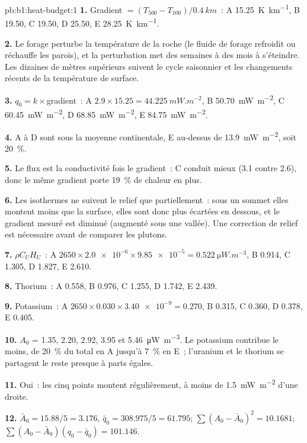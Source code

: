\begin{solution}{pb:b1:heat-budget:1}
\textbf{1.} Gradient $= (T_{500} - T_{100})/\qty{0.4}{km}$~: A \qty{15.25}{K.km^{-1}},
B \num{19.50}, C \num{19.50}, D \num{25.50}, E \qty{28.25}{K.km^{-1}}.

\textbf{2.} Le forage perturbe la température de la roche (le fluide de forage
refroidit ou réchauffe les parois), et la perturbation met des semaines à des mois
à s'éteindre. Les dizaines de mètres supérieurs suivent le cycle saisonnier et les
changements récents de la température de surface.

\textbf{3.} $q_0 = k\times$gradient~: A $2.9\times15.25 = \qty{44.225}{mW.m^{-2}}$,
B \qty{50.70}{mW.m^{-2}}, C \qty{60.45}{mW.m^{-2}}, D \qty{68.85}{mW.m^{-2}},
E \qty{84.75}{mW.m^{-2}}.

\textbf{4.} A à D sont sous la moyenne continentale, E au-dessus de
\qty{13.9}{mW.m^{-2}}, soit \qty{20}{\percent}.

\textbf{5.} Le flux est la conductivité fois le gradient~: C conduit mieux (3.1
contre 2.6), donc le même gradient porte \qty{19}{\percent} de chaleur en plus.

\textbf{6.} Les isothermes ne suivent le relief que partiellement~: sous un sommet
elles montent moins que la surface, elles sont donc plus écartées en dessous, et le
gradient mesuré est diminué (augmenté sous une vallée). Une correction de relief est
nécessaire avant de comparer les plutons.

\textbf{7.} $\rho C_U H_U$~: A $2650\times\num{2.0e-6}\times\num{9.85e-5} =
\qty{0.522}{\micro W.m^{-3}}$, B 0.914, C 1.305, D 1.827, E 2.610.

\textbf{8.} Thorium~: A 0.558, B 0.976, C 1.255, D 1.742, E 2.439.

\textbf{9.} Potassium~: A $2650\times0.030\times\num{3.40e-9} = 0.270$, B 0.315,
C 0.360, D 0.378, E 0.405.

\textbf{10.} $A_0$ = 1.35, 2.20, 2.92, 3.95 et \qty{5.46}{\micro W.m^{-3}}.
Le potassium contribue le moins, de \qty{20}{\percent} du total en A jusqu'à
\qty{7}{\percent} en E~; l'uranium et le thorium se partagent le reste presque à parts égales.

\textbf{11.} Oui~: les cinq points montent régulièrement, à moins de
\qty{1.5}{mW.m^{-2}} d'une droite.

\textbf{12.} $\bar A_0 = 15.88/5 = 3.176$, $\bar q_0 = 308.975/5 = 61.795$;
$\sum(A_0 - \bar A_0)^2 = 10.1681$; $\sum(A_0 - \bar A_0)(q_0 - \bar q_0) =
101.146$.


\end{solution}
